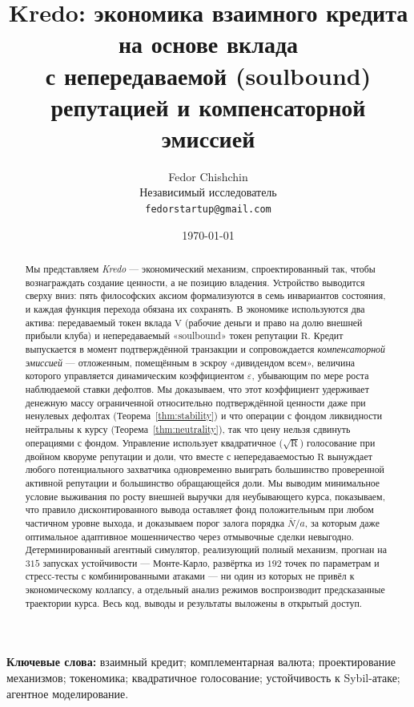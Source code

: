 \documentclass[11pt]{article}
\title{\textbf{Kredo}: экономика взаимного кредита на основе вклада\\
с непередаваемой (soulbound) репутацией и компенсаторной эмиссией}
\author{Fedor Chishchin\\
\small Независимый исследователь\\
\small \texttt{fedorstartup@gmail.com}}
\date{\today}
\theoremstyle{plain}
\theoremstyle{definition}
\theoremstyle{remark}
\newcommand{\V}{\mathrm{V}}
\newcommand{\R}{\mathrm{R}}
\begin{document}
\maketitle

\begin{abstract}
Мы представляем \emph{Kredo} --- экономический механизм, спроектированный так, чтобы вознаграждать создание ценности, а не позицию владения. Устройство выводится сверху вниз: пять философских аксиом формализуются в семь инвариантов состояния, и каждая функция перехода обязана их сохранять. В экономике используются два актива: передаваемый токен вклада $\V$ (рабочие деньги и право на долю внешней прибыли клуба) и непередаваемый «soulbound» токен репутации $\R$. Кредит выпускается в момент подтверждённой транзакции и сопровождается \emph{компенсаторной эмиссией} --- отложенным, помещённым в эскроу «дивидендом всем», величина которого управляется динамическим коэффициентом $\varepsilon$, убывающим по мере роста наблюдаемой ставки дефолтов. Мы доказываем, что этот коэффициент удерживает денежную массу ограниченной относительно подтверждённой ценности даже при ненулевых дефолтах (Теорема~\ref{thm:stability}) и что операции с фондом ликвидности нейтральны к курсу (Теорема~\ref{thm:neutrality}), так что цену нельзя сдвинуть операциями с фондом. Управление использует квадратичное ($\sqrt{\R}$) голосование при двойном кворуме репутации и доли, что вместе с непередаваемостью $\R$ вынуждает любого потенциального захватчика одновременно выиграть большинство проверенной активной репутации и большинство обращающейся доли. Мы выводим минимальное условие выживания по росту внешней выручки для неубывающего курса, показываем, что правило дисконтированного вывода оставляет фонд положительным при любом частичном уровне выхода, и доказываем порог залога порядка $\bar N/a$, за которым даже оптимальное адаптивное мошенничество через отмывочные сделки невыгодно. Детерминированный агентный симулятор, реализующий полный механизм, прогнан на $315$ запусках устойчивости --- Монте-Карло, развёртка из $192$ точек по параметрам и стресс-тесты с комбинированными атаками --- ни один из которых не привёл к экономическому коллапсу, а отдельный анализ режимов воспроизводит предсказанные траектории курса. Весь код, выводы и результаты выложены в открытый доступ.
\end{abstract}

\noindent\textbf{Ключевые слова:} взаимный кредит; комплементарная валюта; проектирование механизмов; токеномика; квадратичное голосование; устойчивость к Sybil-атаке; агентное моделирование.
\end{document}

